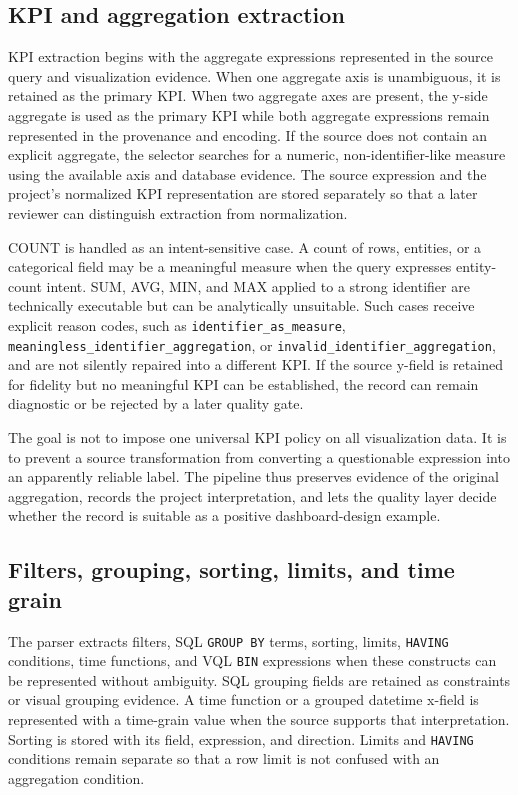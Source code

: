 \subsection{KPI and aggregation extraction}

KPI extraction begins with the aggregate expressions represented in the source query and visualization evidence. When one aggregate axis is unambiguous, it is retained as the primary KPI. When two aggregate axes are present, the y-side aggregate is used as the primary KPI while both aggregate expressions remain represented in the provenance and encoding. If the source does not contain an explicit aggregate, the selector searches for a numeric, non-identifier-like measure using the available axis and database evidence. The source expression and the project's normalized KPI representation are stored separately so that a later reviewer can distinguish extraction from normalization.

COUNT is handled as an intent-sensitive case. A count of rows, entities, or a categorical field may be a meaningful measure when the query expresses entity-count intent. SUM, AVG, MIN, and MAX applied to a strong identifier are technically executable but can be analytically unsuitable. Such cases receive explicit reason codes, such as \texttt{identifier\_as\_measure}, \nolinkurl{meaningless_identifier_aggregation}, or \nolinkurl{invalid_identifier_aggregation}, and are not silently repaired into a different KPI. If the source y-field is retained for fidelity but no meaningful KPI can be established, the record can remain diagnostic or be rejected by a later quality gate.

The goal is not to impose one universal KPI policy on all visualization data. It is to prevent a source transformation from converting a questionable expression into an apparently reliable label. The pipeline thus preserves evidence of the original aggregation, records the project interpretation, and lets the quality layer decide whether the record is suitable as a positive dashboard-design example.

\subsection{Filters, grouping, sorting, limits, and time grain}

The parser extracts filters, SQL \texttt{GROUP\ BY} terms, sorting, limits, \texttt{HAVING} conditions, time functions, and VQL \texttt{BIN} expressions when these constructs can be represented without ambiguity. SQL grouping fields are retained as constraints or visual grouping evidence. A time function or a grouped datetime x-field is represented with a time-grain value when the source supports that interpretation. Sorting is stored with its field, expression, and direction. Limits and \texttt{HAVING} conditions remain separate so that a row limit is not confused with an aggregation condition.

